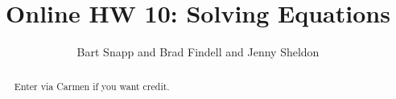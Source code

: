 \documentclass[handout,space,nooutcomes]{xourse}
\title{Online HW 10: Solving Equations}
\author{Bart Snapp and Brad Findell and Jenny Sheldon}
\begin{document}
\begin{abstract}
Enter via Carmen if you want credit.   
\end{abstract}
\maketitle


\end{document}
